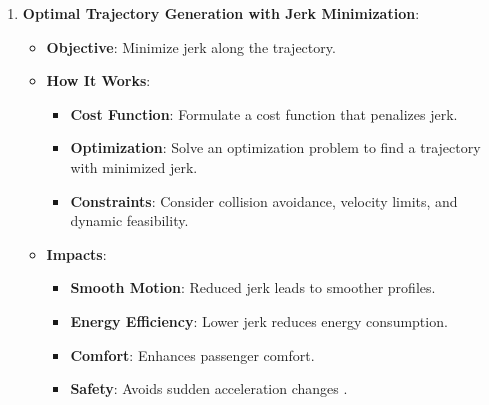 \documentclass[conference]{IEEEtran}
\begin{document}
\begin{enumerate}
    \item \textbf{Optimal Trajectory Generation with Jerk Minimization}:
          \begin{itemize}
              \item \textbf{Objective}: Minimize jerk along the trajectory.
              \item \textbf{How It Works}:
                    \begin{itemize}
                        \item \textbf{Cost Function}: Formulate a cost function that penalizes jerk.
                        \item \textbf{Optimization}: Solve an optimization problem to find a trajectory with minimized jerk.
                        \item \textbf{Constraints}: Consider collision avoidance, velocity limits, and dynamic feasibility.
                    \end{itemize}
              \item \textbf{Impacts}:
                    \begin{itemize}
                        \item \textbf{Smooth Motion}: Reduced jerk leads to smoother profiles.
                        \item \textbf{Energy Efficiency}: Lower jerk reduces energy consumption.
                        \item \textbf{Comfort}: Enhances passenger comfort.
                        \item \textbf{Safety}: Avoids sudden acceleration changes \cite{b4}.
                    \end{itemize}
          \end{itemize}
\end{enumerate}
\end{document}

